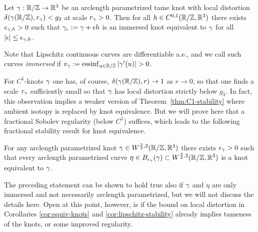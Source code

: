 \begin{corollary}\label{cor:lipschitz-stability}
Let $\gamma:\mathbb{R}/\mathbb{Z}\to\mathbb{R}^3$ be an arclength parametrized tame 
knot with 
local distortion $\delta(\gamma(\mathbb{R}/\mathbb{Z}),r_\gamma)< g_3$
at scale $r_\gamma>0$. Then for all $h\in C^{0,1}(\mathbb{R}/\mathbb{Z},\mathbb{R}^3)$
there exists $\epsilon_{\gamma,h}>0$ such that $\gamma_\epsilon:=\gamma+\epsilon h$ is
an immersed knot equivalent to $\gamma$ for all $|\epsilon| \le \epsilon_{\gamma,h}$.
\end{corollary}
Note that Lipschitz continuous curves are differentiable a.e., and we call such curves
\emph{immersed} if $v_\g:=\essinf_{u\in\R/\Z}|\g'(u)|>0$.

For $C^1$-knots $\gamma$ one has, of course, $\delta(\gamma(\mathbb{R}/\mathbb{Z}),r)\to 1 $ as $r\to 0$, so that
one finds a scale $r_\gamma$ sufficiently small so that $\gamma$ has 
local distortion strictly below $g_3$.
In fact, this observation implies a weaker version of Theorem~\ref{thm:C1-stability} where ambient isotopy is replaced by knot equivalence.
But we will prove here
that a fractional Sobolev regularity (below $C^1$) suffices, 
which leads to the following fractional stability result for knot equivalence.
\begin{corollary}
\label{cor:fractional-stability}
For any arclength parametrized knot $\gamma\in W^{\frac32,2}(\mathbb{R}/\mathbb{Z},\mathbb{R}^3)$ there exists
$\epsilon_\gamma>0$ such that every arclength parametrized
curve $\eta\in B_{\epsilon_\gamma}(\gamma)\subset
W^{\frac32,2}(\mathbb{R}/\mathbb{Z},\mathbb{R}^3)$ is a knot equivalent to $\gamma$.
\end{corollary}
The preceding statement can be shown to hold true also
if $\gamma$ and
$\eta$ are only immersed and not necessarily arclength
parametrized, but we will not discuss the details here.
Open at this point, however, is if the bound on local 
distortion in Corollaries \ref{cor:equiv-knots} and 
\ref{cor:lipschitz-stability} already
implies tameness of the knots, or some improved regularity. 


